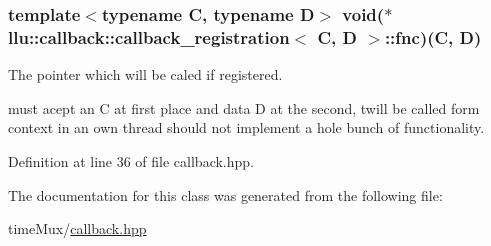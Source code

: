 \hypertarget{classllu_1_1callback_1_1callback__registration_a470bbcee9d41e0070e9630461b88084d}{
\subsubsection[{fnc}]{\setlength{\rightskip}{0pt plus 5cm}template$<$typename C, typename D$>$ void($\ast$ {\bf llu\+::callback\+::callback\+\_\+registration}$<$ C, D $>$\+::fnc)(C, D)}}\label{classllu_1_1callback_1_1callback__registration_a470bbcee9d41e0070e9630461b88084d}


The pointer which will be caled if registered. 

must acept an C at first place and data D at the second, twill be called form context in an own thread should not implement a hole bunch of functionality. 

Definition at line 36 of file callback.\+hpp.



The documentation for this class was generated from the following file\+:\begin{DoxyCompactItemize}
\item 
time\+Mux/\hyperlink{callback_8hpp}{callback.\+hpp}\end{DoxyCompactItemize}
